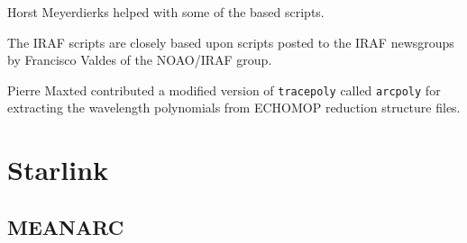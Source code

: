 \documentclass[twoside,11pt]{starlink}
\begin{document}
Horst Meyerdierks helped with some of the 
based scripts.

The IRAF scripts are closely based upon scripts posted to the IRAF
newsgroups by Francisco Valdes of the NOAO/IRAF group.

Pierre Maxted contributed a modified version of \verb+tracepoly+ called
\verb+arcpoly+ for extracting the wavelength polynomials from ECHOMOP
reduction structure files.

\newpage

\section{\label{se_starlink}Starlink}

\subsection{\label{se_meanarc}MEANARC}
\end{document}
